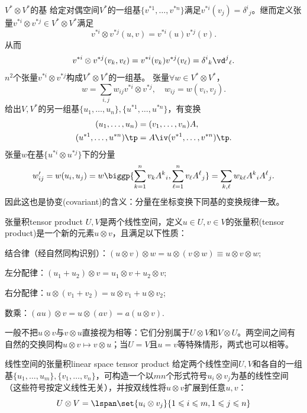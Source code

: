 \begin{example}{$V^\ast\otimes V^\ast$的基}{}
	给定对偶空间$V^\ast$的一组基$\{v^{\ast 1},\ldots,v^{\ast n}\}$满足$v^{\ast i}(v_j)=\delta^i{}_j$。继而定义张量$v^{\ast i}\otimes v^{\ast j}\in V^\ast\otimes V^\ast$满足
	\[
		v^{\ast i}\otimes v^{\ast j}(u,v)=v^{\ast i}(u)v^{\ast j}(v).
	\]
	从而
	\[
		v^{\ast i}\otimes v^{\ast j}(v_k,v_\ell)=v^{\ast i}(v_k)v^{\ast j}(v_\ell)=\delta^i{}_k\vd^j{}_\ell.
	\]
	$n^2$个张量$v^{\ast i}\otimes v^{\ast j}$构成$V^\ast\otimes V^\ast$的一组基。
	\tcblower
	张量$\forall w\in V^\ast\otimes V^\ast$，
	\[
		w=\sum_{i,j}w_{ij}v^{\ast i}\otimes v^{\ast j},\quad w_{ij}=w(v_i,v_j).
	\]
	给出$V,V^\ast$的另一组基$\{u_1,\ldots,u_n\},\{u^{\ast 1},\ldots,u^{\ast n}\}$，有变换
	\begin{align*}
		(u_1,\ldots,u_n)&=(v_1,\ldots,v_n)A,\\
		(u^{\ast 1},\ldots,u^{\ast n})\tp&=A\iv(v^{\ast 1},\ldots,v^{\ast n})\tp.
	\end{align*}
	张量$w$在基$\{u^{\ast i}\otimes u^{\ast j}\}$下的分量
	\[
		w'_{ij}=w(u_i,u_j)=w\biggp{\sum_{k=1}^nv_kA^k{}_i,\sum_{\ell=1}^nv_\ell A^\ell{}_j}=\sum_{k,\ell}w_{k\ell}A^k{}_iA^\ell{}_j.
	\]
	因此这也是协变(covariant)的含义：分量在坐标变换下同基的变换规律一致。
\end{example}
\begin{definition}{张量积}{tensor product}
	$U,V$是两个线性空间，定义$u\in U,v\in V$的张量积(tensor product)是一个新的元素$u\otimes v$，且满足以下性质：
	\begin{compactitem}
		\item 结合律（经自然同构识别）：$(u\otimes v)\otimes w=u\otimes(v\otimes w)\equiv u\otimes v\otimes w;$
		\item 左分配律：$(u_1+u_2)\otimes v=u_1\otimes v+u_2\otimes v;$
		\item 右分配律：$u\otimes(v_1+v_2)=u\otimes v_1+u\otimes v_2;$
		\item 数乘：$(au)\otimes v=u\otimes(av)=a(u\otimes v).$
	\end{compactitem}
\end{definition}
\begin{remark}
	一般不把$u\otimes v$与$v\otimes u$直接视为相等：它们分别属于$U\otimes V$和$V\otimes U$。两空间之间有自然的交换同构$u\otimes v\mapsto v\otimes u$；当$U=V$且$u=v$等特殊情形，两式也可以相等。
\end{remark}
\begin{definition}{线性空间的张量积}{linear space tensor product}
	给定两个线性空间$U,V$和各自的一组基$\{u_1,\ldots,u_m\},\{v_1,\ldots,v_n\}$，可构造一个以$mn$个形式符号$u_i\otimes v_j$为基的线性空间（这些符号按定义线性无关），并按双线性将$u\otimes v$扩展到任意$u,v$：
	\begin{equation}
		U\otimes V=\lspan\set{u_i\otimes v_j}{1\leqslant i\leqslant m,1\leqslant j\leqslant n}
	\end{equation}
\end{definition}
